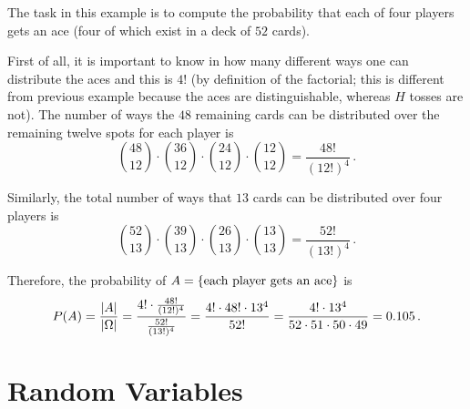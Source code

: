 \begin{ex}
The task in this example is to compute the probability that each of four players gets an ace (four of which exist in a deck of $52$ cards).

First of all, it is important to  know in how many different ways one can distribute the aces and this is $4!$ (by definition of the factorial; this is different from previous example because the aces are distinguishable, whereas $H$ tosses are not). The number of ways the $48$ remaining cards can be distributed over the remaining twelve spots for each player is
\begin{equation*}
\binom{48}{12} \cdot \binom{36}{12} \cdot \binom{24}{12} \cdot \binom{12}{12} = \frac{48!}{(12!)^4} \, .
\end{equation*}

Similarly, the total number of ways that $13$ cards can be distributed over four players is
\begin{equation*}
\binom{52}{13} \cdot \binom{39}{13} \cdot \binom{26}{13} \cdot \binom{13}{13} = \frac{52!}{(13!)^4} \, .
\end{equation*}

Therefore, the probability of $A = \qty{\text{each player gets an ace}}$ is
\begin{equation*}
P(A) = \frac{\abs{A}}{\abs{\Omega}} = \frac{4! \cdot \frac{48!}{(12!)^4}}{\frac{52!}{(13!)^4}} = \frac{4! \cdot 48! \cdot 13^4}{52!} = \frac{4! \cdot 13^4}{52 \cdot 51 \cdot 50 \cdot 49} = 0.105 \, .
\end{equation*}
\end{ex}



\newpage



\section{Random Variables}
